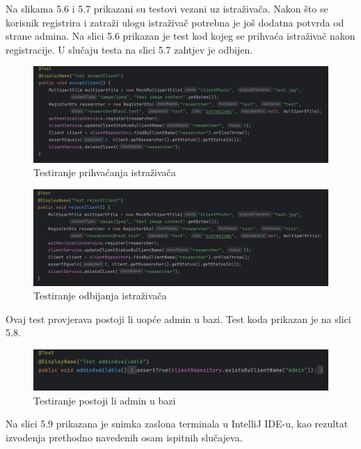 			Na slikama 5.6 i 5.7 prikazani su testovi vezani uz istraživača. Nakon što se korisnik registrira i zatraži ulogu istraživač potrebna je još dodatna potvrda od strane admina. Na slici 5.6 prikazan je test kod kojeg se prihvaća istraživač nakon registracije. U slučaju testa na slici 5.7 zahtjev je odbijen. 
			
			\begin{figure}[H]
				\centering
				\includegraphics[width=\textwidth]{slike/istrazivac1.JPEG}
				\caption{Testiranje prihvaćanja istraživača }
				\label{fig:dijagram_baze}
			\end{figure}
			
			\begin{figure}[H]
				\centering
				\includegraphics[width=\textwidth]{slike/istrazivac2.JPEG}
				\caption{Testiranje odbijanja istraživača }
				\label{fig:dijagram_baze}
			\end{figure}
			
			Ovaj test provjerava postoji li uopće admin u bazi. Test koda prikazan je na slici 5.8.
			
			\begin{figure}[H]
				\centering
				\includegraphics[width=\textwidth]{slike/admin1.JPEG}
				\caption{Testiranje postoji li admin u bazi}
				\label{fig:dijagram_baze}
			\end{figure}
			
			Na slici 5.9 prikazana je snimka zaslona terminala u IntelliJ IDE-u, kao rezultat izvodenja prethodno navedenih osam ispitnih slučajeva. 
			
